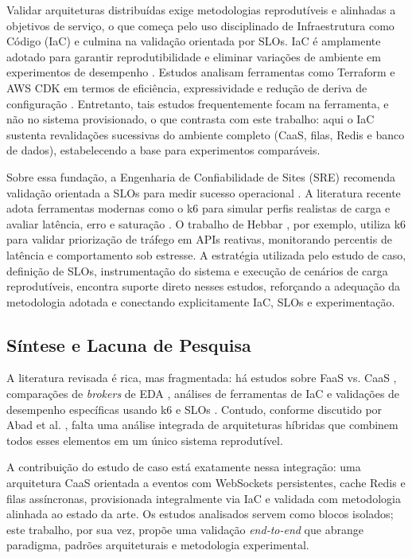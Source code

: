 Validar arquiteturas distribuídas exige metodologias reprodutíveis e alinhadas a objetivos de serviço,
o que começa pelo uso disciplinado de Infraestrutura como Código (IaC) e culmina na validação orientada por SLOs.
IaC é amplamente adotado para garantir reprodutibilidade e eliminar variações de ambiente em experimentos de desempenho \cite{pessa_iac_2023}.
Estudos analisam ferramentas como Terraform e AWS CDK em termos de eficiência,
expressividade e redução de deriva de configuração \cite{guerriero_iac_2019}.
Entretanto, tais estudos frequentemente focam na ferramenta, e não no sistema provisionado,
o que contrasta com este trabalho: aqui o IaC sustenta revalidações sucessivas do ambiente completo
(CaaS, filas, Redis e banco de dados), estabelecendo a base para experimentos comparáveis.

Sobre essa fundação, a Engenharia de Confiabilidade de Sites (SRE) recomenda validação
orientada a SLOs para medir sucesso operacional \cite{mccoy_slo_2020}.
A literatura recente adota ferramentas modernas como o k6 para simular perfis realistas
de carga e avaliar latência, erro e saturação \cite{cervone_k6_2024}. O trabalho de Hebbar \cite{hebbar_reactive_2025},
por exemplo, utiliza k6 para validar priorização de tráfego em APIs reativas, monitorando
percentis de latência e comportamento sob estresse. A estratégia utilizada pelo estudo de
caso, definição de SLOs, instrumentação do sistema e execução de cenários de carga
reprodutíveis, encontra suporte direto nesses estudos, reforçando a adequação da
metodologia adotada e conectando explicitamente IaC, SLOs e experimentação.

\subsection{Síntese e Lacuna de Pesquisa}
\label{sec:lacuna}

A literatura revisada é rica, mas fragmentada: há estudos sobre FaaS vs. CaaS \cite{lloyd_serverless_investigation_2018},
comparações de \textit{brokers} de EDA \cite{thepphakan_pulsar_rabbitmq_2025}, análises de ferramentas de IaC \cite{pessa_iac_2023}
e validações de desempenho específicas usando k6 e SLOs \cite{hebbar_reactive_2025}.
Contudo, conforme discutido por Abad et al. \cite{abad_serverless_gap_2021},
falta uma análise integrada de arquiteturas híbridas que combinem todos esses elementos em um único sistema reprodutível.

A contribuição do estudo de caso está exatamente nessa integração: uma arquitetura CaaS
orientada a eventos com WebSockets persistentes, cache Redis e filas assíncronas,
provisionada integralmente via IaC e validada com metodologia alinhada ao estado da arte.
Os estudos analisados servem como blocos isolados; este trabalho, por sua vez,
propõe uma validação \textit{end-to-end} que abrange paradigma, padrões arquiteturais e metodologia experimental.
